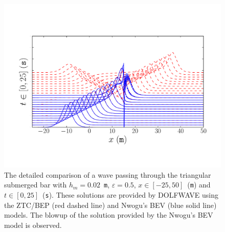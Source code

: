 \begin{figure}
\bwfig
  \centering
  \includegraphics[width=\largefig]{chapters/lopes/pdf/epsilon0_5.pdf}
  \caption{The detailed comparison of a wave passing through the
    triangular submerged bar with $h_m=0.02$~{\tt m}, $\varepsilon=0.5$,
    $x\in[-25,50]$~({\tt m}) and $t\in[0,25]$~({\tt s}).  These solutions
    are provided by DOLFWAVE using the ZTC/BEP (red dashed line) and
    Nwogu's BEV (blue solid line) models.  The blowup of the solution
    provided by the Nwogu's BEV model is observed.}
  \label{fig:lopes:zn05}
\end{figure}


